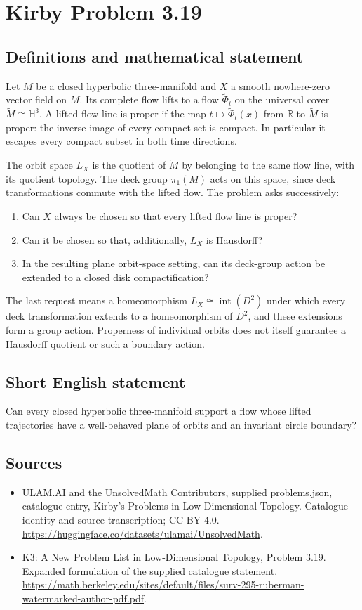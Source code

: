 \documentclass[11pt,a4paper]{article}
\begin{document}
\section*{Kirby Problem 3.19}\label{statement}

\subsection{Definitions and mathematical statement}
Let $M$ be a closed hyperbolic three-manifold and $X$ a smooth nowhere-zero
vector field on $M$. Its complete flow lifts to a flow $\widetilde\Phi_t$
on the universal cover $\widetilde M\cong\mathbb H^3$. A lifted flow line
is proper if the map $t\mapsto\widetilde\Phi_t(x)$ from $\mathbb R$ to
$\widetilde M$ is proper: the inverse image of every compact set is compact.
In particular it escapes every compact subset in both time directions.

The orbit space $L_X$ is the quotient of $\widetilde M$ by belonging to the
same flow line, with its quotient topology. The deck group $\pi_1(M)$ acts
on this space, since deck transformations commute with the lifted flow.
The problem asks successively:
\begin{enumerate}
\item Can $X$ always be chosen so that every lifted flow line is proper?
\item Can it be chosen so that, additionally, $L_X$ is Hausdorff?
\item In the resulting plane orbit-space setting, can its deck-group action
be extended to a closed disk compactification?
\end{enumerate}
The last request means a homeomorphism $L_X\cong\operatorname{int}(D^2)$
under which every deck transformation extends to a homeomorphism of $D^2$,
and these extensions form a group action. Properness of individual orbits
does not itself guarantee a Hausdorff quotient or such a boundary action.
\subsection{Short English statement}
Can every closed hyperbolic three-manifold support a flow whose lifted trajectories have a well-behaved plane of orbits and an invariant circle boundary?
\subsection{Sources}
\begin{itemize}
\item[S1] ULAM.AI and the UnsolvedMath Contributors, supplied problems.json, catalogue entry, Kirby's Problems in Low-Dimensional Topology. Catalogue identity and source transcription; CC BY 4.0.
\url{https://huggingface.co/datasets/ulamai/UnsolvedMath}.
\item[S2] K3: A New Problem List in Low-Dimensional Topology, Problem 3.19. Expanded formulation of the supplied catalogue statement.
\url{https://math.berkeley.edu/sites/default/files/surv-295-ruberman-watermarked-author-pdf.pdf}.
\end{itemize}
\end{document}
